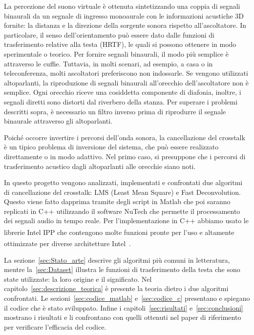 \documentclass[12pt,a4paper,titlepage]{article}
\begin{document}
La percezione del suono virtuale è ottenuta sintetizzando una coppia di segnali binaurali da un segnale di ingresso monoaurale con le informazioni acustiche 3D fornite: la distanza e la direzione della sorgente sonora rispetto all'ascoltatore. In particolare, il senso dell'orientamento può essere dato dalle funzioni di trasferimento relative alla testa (HRTF), le quali si possono ottenere in modo sperimentale o teorico. Per fornire segnali binaurali, il modo più semplice è attraverso le cuffie. Tuttavia, in molti scenari, ad esempio, a casa o in teleconferenza, molti ascoltatori preferiscono non indossarle. Se vengono utilizzati altoparlanti, la riproduzione di segnali binaurali all'orecchio dell'ascoltatore non è semplice. Ogni orecchio riceve una cosiddetta componente di diafonia, inoltre, i segnali diretti sono distorti dal riverbero della stanza. Per superare i problemi descritti sopra, è necessario un filtro inverso prima di riprodurre il segnale binaurale attraverso gli altoparlanti. 

Poiché occorre invertire i percorsi dell'onda sonora, la cancellazione del crosstalk è un tipico problema di inversione del sistema, che può essere realizzato direttamente o in modo adattivo. Nel primo caso, si presuppone che i percorsi di trasferimento acustico dagli altoparlanti alle orecchie siano noti. %

In questo progetto vengono analizzati, implementati e confrontati due algoritmi di cancellazione del crosstalk: LMS (Least Mean Square) e Fast Deconvolution.
Questo viene fatto dapprima tramite degli script in Matlab che poi saranno replicati in C++ utilizzando il software NuTech che permette il processamento dei segnali audio in tempo reale. Per l'implementazione in C++ abbiamo usato le librerie Intel\textsuperscript{\tiny\textregistered} IPP che contengono molte funzioni pronte per l'uso e altamente ottimizzate per diverse architetture Intel\textsuperscript{\tiny\textregistered}~\cite{Intel:IPP}.

La sezione~\ref{sec:Stato_arte} descrive gli algoritmi più comuni in letteratura, mentre la~\ref{sec:Dataset} illustra le funzioni di trasferimento della testa che sono state utilizzate: la loro origine e il significato. Nel capitolo~\ref{sec:descrizione_teorica} è presente la teoria dietro i due algoritmi confrontati. Le sezioni~\ref{sec:codice_matlab} e~\ref{sec:codice_c} presentano e spiegano il codice che è stato sviluppato. Infine i capitoli~\ref{sec:risultati} e~\ref{sec:conclusioni} mostrano i risultati e li confrontano con quelli ottenuti nel paper di riferimento per verificare l'efficacia del codice.
\clearpage
\end{document}
